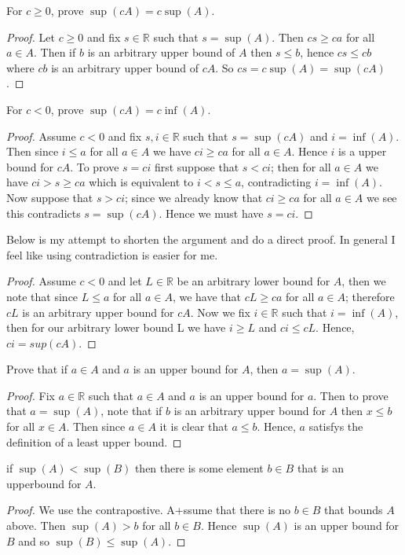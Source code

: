 \documentclass[11pt,largemargins]{homework}
\newcommand{\R}{\mathbb{R}}
\begin{document}
\begin{alphaparts}
    \questionpart
    For $c \geq 0$, prove $\sup(cA) = c\sup(A)$. 

    \begin{proof}
        Let $c  \geq 0$ and fix $s \in \R$ such that $s = \sup(A)$. Then $cs \geq ca $ for all $a \in A$. Then if $b$ is an arbitrary upper bound of $A$ then 
        $s \leq b$, hence $cs \leq cb$ where $cb$ is an arbitrary upper bound of $cA$. So  $cs = c\sup(A) = \sup(cA)$.
    \end{proof}

    \questionpart
    For $c < 0$, prove $\sup(cA) = c\inf(A)$. 

    \begin{proof}
        Assume $c < 0 $ and fix $s, i \in \R$ such that $s = \sup(cA)$ and $i = \inf(A)$. Then since $i \leq a$ for all $a \in A$ we have 
        $ci \geq ca$ for all $a \in A$. Hence $i$ is a upper bound for $cA$. To prove $s = ci$ first suppose that $s < ci$; then
        for all $a \in A$ we have $ci > s \geq ca$ which is equivalent to $i < s \leq a$, contradicting $i = \inf(A)$. Now suppose that 
        $s > ci$; since we already know that $ci \geq ca$ for all $a \in A$ we see this contradicts $s = \sup(cA)$. Hence we must have $s = ci$. 

    \end{proof}

    Below is my attempt to shorten the argument and do a direct proof. In general I feel like using contradiction is easier for me. 
    \begin{proof}
        Assume $c < 0$ and let $L \in \R$ be an arbitrary lower bound for $A$, then we note that since $L \leq a$ for all $a \in A$, we have that 
        $cL \geq ca$ for all $a \in A$; therefore $cL$ is an arbitrary upper bound for $cA$. Now we fix $i \in \R$ such that $i = \inf(A)$, then for our arbitrary lower bound L we have $i \geq L$ and $ci \leq cL$. Hence, $ci = sup(cA)$. 
    \end{proof}
\end{alphaparts}

\question
Prove that if $a \in A$ and $a$ is an upper bound for $A$, then $a = \sup(A)$. 

\begin{proof}
    Fix $a \in \R$ such that $a \in A$ and $a$ is an upper bound for $a$. Then to prove that $a = \sup(A)$, note that 
    if $b$ is an arbitrary upper bound for $A$ then $x \leq b$ for all $x \in A$. Then since $a \in A$ it is clear that $a \leq b$. 
    Hence, $a$ satisfys the definition of a least upper bound. 
\end{proof}

\question
    if $\sup(A) < \sup(B)$ then there is some element $b \in B$ that is an upperbound for $A$.

    \begin{proof}
        We use the contrapostive. A+ssume that there is no $b \in B$ that bounds $A$ above. Then $\sup(A) > b$ for all $b \in B$. Hence $\sup(A)$ is an upper bound for $B$ and so 
        $\sup(B) \leq \sup(A)$. 
    \end{proof}
\end{document}
